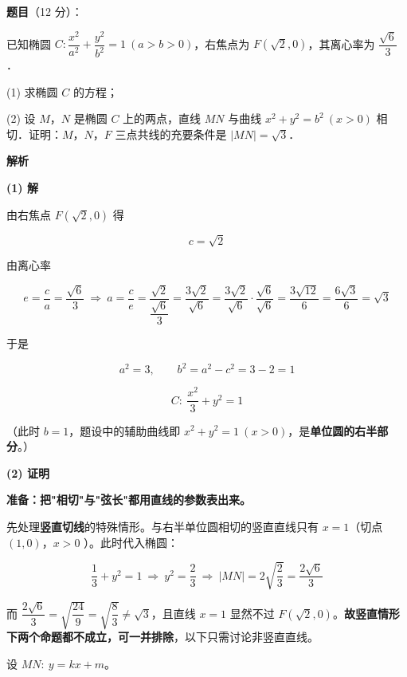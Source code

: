 \begin{answer}

\textbf{题目}（12 分）：

已知椭圆 $C:\dfrac{x^{2}}{a^{2}}+\dfrac{y^{2}}{b^{2}}=1\ (a>b>0)$，右焦点为 $F\left(\sqrt2,0\right)$，其离心率为 $\dfrac{\sqrt6}3$．

  (1) 求椭圆 $C$ 的方程；

  (2) 设 $M$，$N$ 是椭圆 $C$ 上的两点，直线 $MN$ 与曲线 $x^{2}+y^{2}=b^{2}\ (x>0)$ 相切．证明：$M$，$N$，$F$ 三点共线的充要条件是 $|MN|=\sqrt3$．

\textbf{解析}

\par\medskip

\textbf{(1) 解}

由右焦点 $F\left(\sqrt2,0\right)$ 得

\nopagebreak[4]
\[c=\sqrt2\]

由离心率

\nopagebreak[4]
\[e=\frac ca=\frac{\sqrt6}3\ \Longrightarrow\ a=\frac c e=\frac{\sqrt2}{\dfrac{\sqrt6}3}=\frac{3\sqrt2}{\sqrt6}=\frac{3\sqrt2}{\sqrt6}\cdot\frac{\sqrt6}{\sqrt6}=\frac{3\sqrt{12}}6=\frac{6\sqrt3}6=\sqrt3\]

于是

\nopagebreak[4]
\[a^{2}=3,\qquad b^{2}=a^{2}-c^{2}=3-2=1\]

\nopagebreak[4]
\[C:\ \frac{x^{2}}3+y^{2}=1\]

（此时 $b=1$，题设中的辅助曲线即 $x^{2}+y^{2}=1\ (x>0)$，是\textbf{单位圆的右半部分}。）

\par\medskip

\textbf{(2) 证明}

\textbf{准备：把"相切"与"弦长"都用直线的参数表出来。}

先处理\textbf{竖直切线}的特殊情形。与右半单位圆相切的竖直直线只有 $x=1$（切点 $(1,0)$，$x>0$ ）。此时代入椭圆：

\nopagebreak[4]
\[\frac13+y^{2}=1\ \Longrightarrow\ y^{2}=\frac23\ \Longrightarrow\ |MN|=2\sqrt{\frac23}=\frac{2\sqrt6}3\]

而 $\dfrac{2\sqrt6}3=\sqrt{\dfrac{24}9}=\sqrt{\dfrac83}\ne\sqrt3$，且直线 $x=1$ 显然不过 $F\left(\sqrt2,0\right)$。\textbf{故竖直情形下两个命题都不成立，可一并排除}，以下只需讨论非竖直直线。

设 $MN:\ y=kx+m$。


\end{answer}
